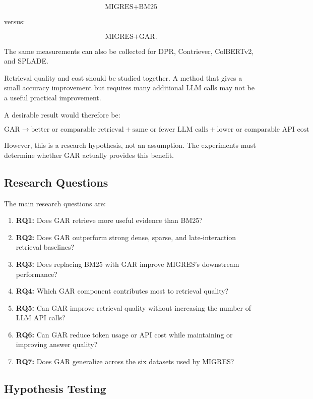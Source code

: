 \documentclass[11pt,a4paper]{article}
\begin{document}
\[
\text{MIGRES+BM25}
\]

versus:

\[
\text{MIGRES+GAR}.
\]

The same measurements can also be collected for DPR, Contriever, ColBERTv2, and SPLADE.

Retrieval quality and cost should be studied together. A method that gives a small accuracy improvement but requires many additional LLM calls may not be a useful practical improvement.

A desirable result would therefore be:

\[
\boxed{
\text{GAR}
\rightarrow
\text{better or comparable retrieval}
+
\text{same or fewer LLM calls}
+
\text{lower or comparable API cost}
}
\]

However, this is a research hypothesis, not an assumption. The experiments must determine whether GAR actually provides this benefit.

\subsection{Research Questions}

The main research questions are:

\begin{enumerate}[leftmargin=1.5em]
\item \textbf{RQ1:} Does GAR retrieve more useful evidence than BM25?
\item \textbf{RQ2:} Does GAR outperform strong dense, sparse, and late-interaction retrieval baselines?
\item \textbf{RQ3:} Does replacing BM25 with GAR improve MIGRES's downstream performance?
\item \textbf{RQ4:} Which GAR component contributes most to retrieval quality?
\item \textbf{RQ5:} Can GAR improve retrieval quality without increasing the number of LLM API calls?
\item \textbf{RQ6:} Can GAR reduce token usage or API cost while maintaining or improving answer quality?
\item \textbf{RQ7:} Does GAR generalize across the six datasets used by MIGRES?
\end{enumerate}

\subsection{Hypothesis Testing}
\end{document}
